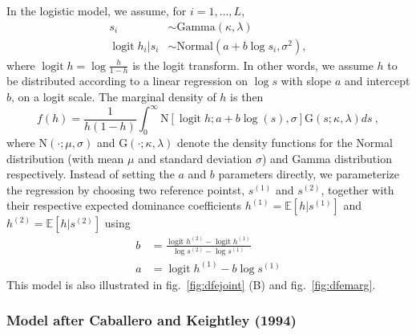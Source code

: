 \documentclass[
  11pt,
]{article}
\begin{document}
In the logistic model, we assume, for \(i=1,\dots,L\), \begin{align*}
    s_i &\sim \mathrm{Gamma}(\kappa, \lambda) \\
    \mathop{\mathrm{logit}}h_i |s_i &\sim \text{Normal}(a + b\log s_i,
    \sigma^2),
\end{align*} where \(\mathop{\mathrm{logit}}h = \log\frac{h}{1-h}\) is
the logit transform. In other words, we assume \(h\) to be distributed
according to a linear regression on \(\log s\) with slope \(a\) and
intercept \(b\), on a logit scale. The marginal density of \(h\) is then
\[f(h) = \frac{1}{h(1-h)}\int_0^\infty \mathrm{N}[\mathop{\mathrm{logit}}h ; a +
     b\log(s),\sigma] \mathrm{G}(s; \kappa, \lambda)ds\ ,\] where
\(\mathrm{N}(\cdot; \mu, \sigma)\) and
\(\mathrm{G}(\cdot;\kappa,\lambda)\) denote the density functions for
the Normal distribution (with mean \(\mu\) and standard deviation
\(\sigma\)) and Gamma distribution respectively. Instead of setting the
\(a\) and \(b\) parameters directly, we parameterize the regression by
choosing two reference pointst, \(s^{(1)}\) and \(s^{(2)}\), together
with their respective expected dominance coefficients
\(h^{(1)} = \mathbb{E}[h|s^{(1)}]\) and
\(h^{(2)}= \mathbb{E}[h|s^{(2)}]\) using \begin{align*}
    b &= \frac{\mathop{\mathrm{logit}}h^{(2)} - \mathop{\mathrm{logit}}h^{(1)}}{\log s^{(2)} - \log s^{(1)}} \\
    a &= \mathop{\mathrm{logit}}h^{(1)} - b\log s^{(1)}
\end{align*} This model is also illustrated in fig.~\ref{fig:dfejoint}
(B) and fig.~\ref{fig:dfemarg}.

\hypertarget{model-after-caballero1994}{%
\subsubsection{Model after Caballero and Keightley
(1994)}\label{model-after-caballero1994}}
\end{document}
